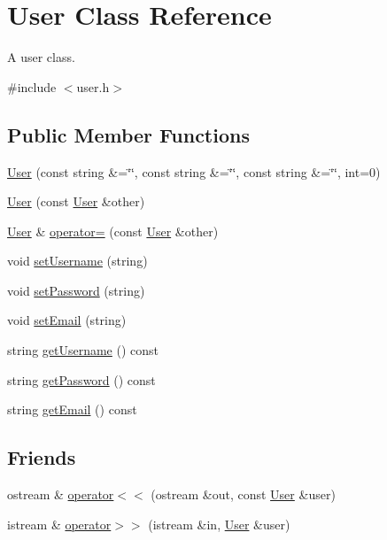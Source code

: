 \hypertarget{class_user}{}\section{User Class Reference}
\label{class_user}


A user class.  




{\ttfamily \#include $<$user.\+h$>$}

\subsection*{Public Member Functions}
\begin{DoxyCompactItemize}
\item 
\hyperlink{class_user_acefd113882ab5f80ea087401b7f9d0b4}{User} (const string \&=\char`\"{}\char`\"{}, const string \&=\char`\"{}\char`\"{}, const string \&=\char`\"{}\char`\"{}, int=0)
\item 
\hyperlink{class_user_aad23b10cdefd26d6ca2ca981e9f9c973}{User} (const \hyperlink{class_user}{User} \&other)
\item 
\hyperlink{class_user}{User} \& \hyperlink{class_user_a00fe82353b0ee8cf6abb1088d36e125b}{operator=} (const \hyperlink{class_user}{User} \&other)
\item 
void \hyperlink{class_user_a453323a9766e086f1967a96d79fc8b76}{set\+Username} (string)
\item 
void \hyperlink{class_user_ab8d3c965902b378fc3472b388a97d56d}{set\+Password} (string)
\item 
void \hyperlink{class_user_a79486f90c900c5dfc272f0ad9a204c95}{set\+Email} (string)
\item 
string \hyperlink{class_user_a82e034043e04b2d750c654c8b2f2ce78}{get\+Username} () const
\item 
string \hyperlink{class_user_a33429bdd1253091697a9c5c5e1448bee}{get\+Password} () const
\item 
string \hyperlink{class_user_a4c647e583bd964f40f687776a0d185dc}{get\+Email} () const
\end{DoxyCompactItemize}
\subsection*{Friends}
\begin{DoxyCompactItemize}
\item 
ostream \& \hyperlink{class_user_acf1038a8d320684dc3fbdd5e4308e062}{operator$<$$<$} (ostream \&out, const \hyperlink{class_user}{User} \&user)
\item 
istream \& \hyperlink{class_user_aae624f64cdd1af3b59c2443cffa82494}{operator$>$$>$} (istream \&in, \hyperlink{class_user}{User} \&user)
\end{DoxyCompactItemize}


